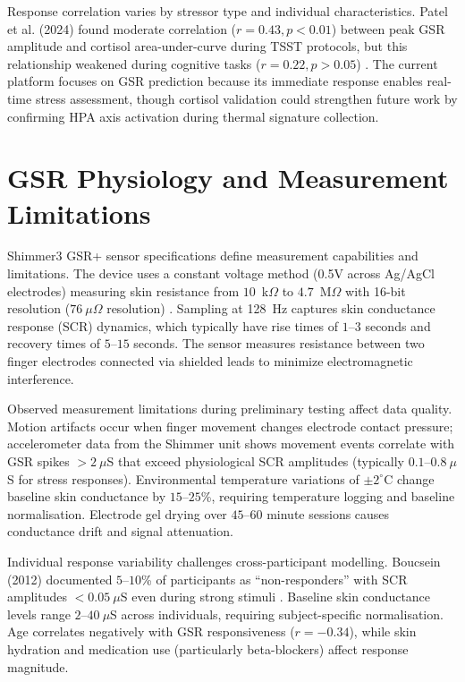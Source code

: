 \documentclass{report}
\begin{document}
    Response correlation varies by stressor type and individual characteristics. Patel et al. (2024) found moderate correlation ($r = 0.43, p < 0.01$) between peak GSR amplitude and cortisol area-under-curve during TSST protocols, but this relationship weakened during cognitive tasks ($r = 0.22, p > 0.05$) \cite{patel2024}. The current platform focuses on GSR prediction because its immediate response enables real-time stress assessment, though cortisol validation could strengthen future work by confirming HPA axis activation during thermal signature collection.

    \section{GSR Physiology and Measurement Limitations}
    \label{sec:gsr_physiology}

    Shimmer3 GSR+ sensor specifications define measurement capabilities and limitations. The device uses a constant voltage method (0.5V across Ag/AgCl electrodes) measuring skin resistance from $10$~k$\Omega$ to $4.7$~M$\Omega$ with 16-bit resolution ($76~\mu\Omega$ resolution) \cite{shimmerdoc8}. Sampling at 128~Hz captures skin conductance response (SCR) dynamics, which typically have rise times of $1$--$3$ seconds and recovery times of $5$--$15$ seconds. The sensor measures resistance between two finger electrodes connected via shielded leads to minimize electromagnetic interference.

    Observed measurement limitations during preliminary testing affect data quality. Motion artifacts occur when finger movement changes electrode contact pressure; accelerometer data from the Shimmer unit shows movement events correlate with GSR spikes $>2~\mu$S that exceed physiological SCR amplitudes (typically $0.1$--$0.8~\mu$S for stress responses). Environmental temperature variations of $\pm 2^{\circ}$C change baseline skin conductance by $15$--$25$\%, requiring temperature logging and baseline normalisation. Electrode gel drying over $45$--$60$ minute sessions causes conductance drift and signal attenuation.

    Individual response variability challenges cross-participant modelling. Boucsein (2012) documented $5$--$10$\% of participants as ``non-responders'' with SCR amplitudes $<0.05~\mu$S even during strong stimuli \cite{boucsein2012}. Baseline skin conductance levels range $2$--$40~\mu$S across individuals, requiring subject-specific normalisation. Age correlates negatively with GSR responsiveness ($r = -0.34$), while skin hydration and medication use (particularly beta-blockers) affect response magnitude.
\end{document}
